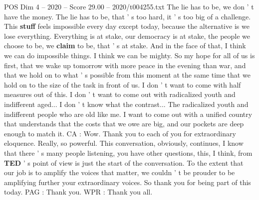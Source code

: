 \begin{textsample}{POS Dim 4 – 2020 – Score 29.00 – 2020/t004255.txt}
The lie has to be, we don ' t have the money.
The lie has to be, that ' s too hard, it ' s too big of a challenge.
This \textbf{stuff} feels impossible every day except today, because the alternative is we lose everything.
Everything is at stake, our democracy is at stake, the people we choose to be, we \textbf{claim} to be, that ' s at stake.
And in the face of that, I think we can do impossible things.
I think we can be mighty.
So my hope for all of us is first, that we wake up tomorrow with more peace in the evening than war, and that we hold on to what ' s possible from this moment at the same time that we hold on to the size of the task in front of us.
I don ' t want to come with half measures out of this.
I don ' t want to come out with radicalized youth and indifferent aged...
I don ' t know what the contrast...
The radicalized youth and indifferent people who are old like me.
I want to come out with a unified country that understands that the costs that we owe are big, and our pockets are deep enough to match it.
CA : Wow.
Thank you to each of you for extraordinary eloquence.
Really, so powerful.
This conversation, obviously, continues, I know that there ' s many people listening, you have other questions, this, I think, from \textbf{TED} ' s point of view is just the start of the conversation.
To the extent that our job is to amplify the voices that matter, we couldn ' t be prouder to be amplifying further your extraordinary voices.
So thank you for being part of this today.
PAG : Thank you.
WPR : Thank you all.

\end{textsample}
